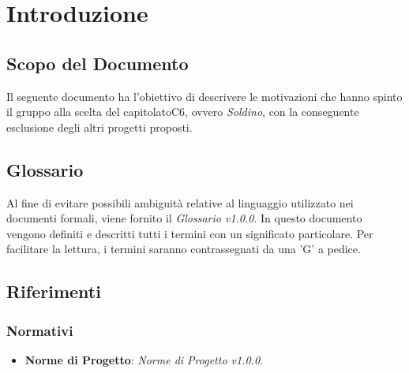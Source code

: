\section{Introduzione}
\subsection{Scopo del Documento}
	Il seguente documento ha l'obiettivo di descrivere le motivazioni che hanno spinto il gruppo alla scelta del capitolato\glosp C6, ovvero \textit{Soldino}, con la conseguente esclusione degli altri progetti proposti.
	
\subsection{Glossario}
Al fine di evitare possibili ambiguità relative al linguaggio utilizzato nei documenti formali, viene fornito il \textit{Glossario v1.0.0}. In questo documento vengono definiti e descritti tutti i termini con un significato particolare. Per facilitare la lettura, i termini saranno contrassegnati da una 'G' a pedice.
	
\subsection{Riferimenti}
\subsubsection{Normativi}
\begin{itemize}
	\item \textbf{Norme di Progetto}: \textit{Norme di Progetto v1.0.0}.
\end{itemize}
	
